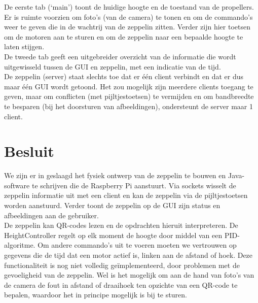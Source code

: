 \documentclass[eind]{penoverslag}
\begin{document}
De eerste tab (`main') toont de huidige hoogte en de toestand van de propellers. Er is ruimte voorzien om foto's (van de camera) te tonen en om de commando's weer te geven die in de wachtrij van de zeppelin zitten. Verder zijn hier toetsen om de motoren aan te sturen en om de zeppelin naar een bepaalde hoogte te laten stijgen.\\

De tweede tab geeft een uitgebreider overzicht van de informatie die wordt uitgewisseld tussen de GUI en zeppelin, met een indicatie van de tijd. \\

De zeppelin (server) staat slechts toe dat er \'e\'en client verbindt en dat er dus maar \'e\'en GUI wordt getoond. Het zou mogelijk zijn meerdere clients toegang te geven, maar om conflicten (met pijltjestoetsen) te vermijden en om bandbreedte te besparen (bij het doorsturen van afbeeldingen), ondersteunt de server maar 1 client. \\




\section{Besluit}
We zijn er in geslaagd het fysiek ontwerp van de zeppelin te bouwen en Java-software te schrijven die de Raspberry Pi aanstuurt. Via sockets wisselt de zeppelin informatie uit met een client en kan de zeppelin via de pijltjestoetsen worden aanstuurd. Verder toont de zeppelin op de GUI zijn status en afbeeldingen aan de gebruiker. \\

De zeppelin kan QR-codes lezen en de opdrachten hieruit interpreteren. De HeightController regelt op elk moment de hoogte door middel van een PID-algoritme. Om andere commando's uit te voeren moeten we vertrouwen op gegevens die de tijd dat een motor actief is, linken aan de afstand of hoek. Deze functionaliteit is nog niet volledig ge\"implementeerd, door problemen met de gevoeligheid van de zeppelin. Wel is het mogelijk om aan de hand van foto's van de camera de fout in afstand of draaihoek ten opzichte van een QR-code te bepalen, waardoor het in principe mogelijk is bij te sturen. \\



\newpage\makeappendix
\end{document}
